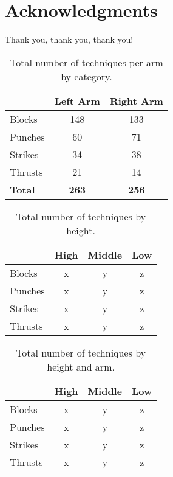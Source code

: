 \documentclass[10pt,twocolumn,a4paper]{article}
\begin{document}
\section*{Acknowledgments}

Thank you, thank you, thank you!




\begin{table}
  \centering
  \begin{tabular}{l|c|c} \hline \hline
    & Left Arm & Right Arm \\ \hline

    Blocks    & 148   & 133 \\
    Punches   &  60   &  71 \\
    Strikes   &  34   &  38 \\
    Thrusts   &  21   &  14 \\
    \hline

    \textbf{Total}   & \textbf{263}   & \textbf{256} \\
    \hline
  \end{tabular}
  \caption{Total number of techniques per arm by category.}
  \end{table}


\begin{table}
  \centering
  \begin{tabular}{l|c|c|c} \hline \hline
    & High & Middle & Low \\ \hline

    Blocks    & x   & y   & z \\
    Punches   & x   & y   & z \\
    Strikes   & x   & y   & z \\
    Thrusts   & x   & y   & z \\
    \hline

  \end{tabular}
  \caption{Total number of techniques by height.}
  \end{table}


\begin{table}
  \centering
  \begin{tabular}{l|c|c|c} \hline \hline
    & High & Middle & Low \\ \hline

    Blocks    & x   & y   & z \\
    Punches   & x   & y   & z \\
    Strikes   & x   & y   & z \\
    Thrusts   & x   & y   & z \\
    \hline

  \end{tabular}
  \caption{Total number of techniques by height and arm.}
  \end{table}
\end{document}
